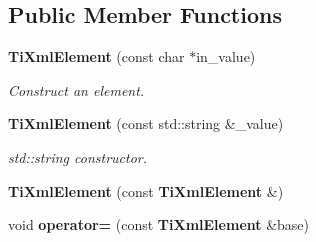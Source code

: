 \subsection*{Public Member Functions}
\begin{CompactItemize}
\item 
{\bf Ti\-Xml\-Element} (const char $\ast$in\_\-value)\label{classTiXmlElement_TiXmlElementa0}

\begin{CompactList}\small\item\em Construct an element. \item\end{CompactList}\item 
{\bf Ti\-Xml\-Element} (const std::string \&\_\-value)\label{classTiXmlElement_TiXmlElementa1}

\begin{CompactList}\small\item\em std::string constructor. \item\end{CompactList}\item 
{\bf Ti\-Xml\-Element} (const {\bf Ti\-Xml\-Element} \&)\label{classTiXmlElement_TiXmlElementa2}

\item 
void {\bf operator=} (const {\bf Ti\-Xml\-Element} \&base)\label{classTiXmlElement_TiXmlElementa3}


\end{CompactItemize}
